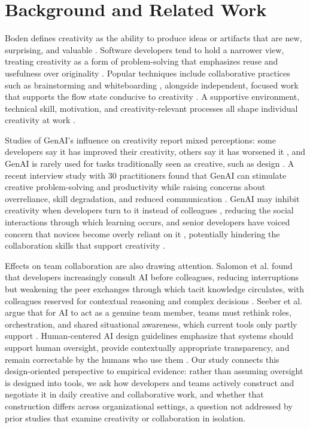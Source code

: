 \documentclass[10pt,journal,compsoc]{IEEEtran}
\begin{document}
\section{Background and Related Work}

Boden defines creativity as the ability to produce ideas or artifacts that are new, surprising, and valuable \cite{boden2004}. Software developers tend to hold a narrower view, treating creativity as a form of problem-solving that emphasizes reuse and usefulness over originality \cite{inman2024}. Popular techniques include collaborative practices such as brainstorming and whiteboarding \cite{groeneveld2021}, alongside independent, focused work that supports the flow state conducive to creativity \cite{ritonummi2023}. A supportive environment, technical skill, motivation, and creativity-relevant processes all shape individual creativity at work \cite{amabile2016}.

Studies of GenAI's influence on creativity report mixed perceptions: some developers say it has improved their creativity, others say it has worsened it \cite{jetbrains2025,meem2025}, and GenAI is rarely used for tasks traditionally seen as creative, such as design \cite{pereira2025}. A recent interview study with 30 practitioners found that GenAI can stimulate creative problem-solving and productivity while raising concerns about overreliance, skill degradation, and reduced communication \cite{zacharias2026}. GenAI may inhibit creativity when developers turn to it instead of colleagues \cite{salomon2026}, reducing the social interactions through which learning occurs, and senior developers have voiced concern that novices become overly reliant on it \cite{pereira2025}, potentially hindering the collaboration skills that support creativity \cite{zhou2018}.

Effects on team collaboration are also drawing attention. Salomon et al. found that developers increasingly consult AI before colleagues, reducing interruptions but weakening the peer exchanges through which tacit knowledge circulates, with colleagues reserved for contextual reasoning and complex decisions \cite{salomon2026}. Seeber et al. argue that for AI to act as a genuine team member, teams must rethink roles, orchestration, and shared situational awareness, which current tools only partly support \cite{seeber2020}. Human-centered AI design guidelines emphasize that systems should support human oversight, provide contextually appropriate transparency, and remain correctable by the humans who use them \cite{amershi2019}. Our study connects this design-oriented perspective to empirical evidence: rather than assuming oversight is designed into tools, we ask how developers and teams actively construct and negotiate it in daily creative and collaborative work, and whether that construction differs across organizational settings, a question not addressed by prior studies that examine creativity \cite{jetbrains2025,meem2025,pereira2025} or collaboration \cite{salomon2026,seeber2020} in isolation.
\end{document}
